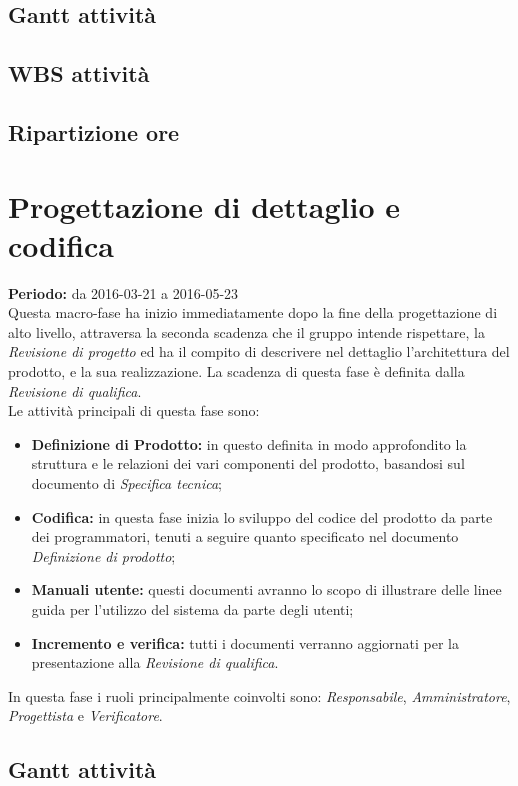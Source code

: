 \documentclass[a4paper]{report}
\begin{document}
			\subsection{Gantt attività}
			\subsection{WBS attività}
			\subsection{Ripartizione ore}
		\section{Progettazione di dettaglio e codifica}
			\textbf{Periodo:} da 2016-03-21 a 2016-05-23 \\
			Questa macro-fase ha inizio immediatamente dopo la fine della progettazione di alto livello, attraversa la seconda 
			scadenza che il gruppo intende rispettare, la \emph{Revisione di progetto} ed ha il compito di descrivere nel dettaglio 
			l'architettura del prodotto, e la sua realizzazione. La scadenza di questa fase è definita dalla 
			\emph{Revisione di qualifica}. \\Le attività principali di questa fase sono:
			\begin{itemize}
				\item \textbf{Definizione di Prodotto:} in questo definita in modo approfondito la struttura e le relazioni 
				dei vari componenti del prodotto, basandosi sul documento di \emph{Specifica tecnica}; 
				\item \textbf{Codifica:} in questa fase inizia lo sviluppo del codice del prodotto da parte dei programmatori, 
				tenuti a seguire quanto specificato nel documento \emph{Definizione di prodotto};
				\item \textbf{Manuali utente:} questi documenti avranno lo scopo di illustrare delle linee guida per l'utilizzo 
				del sistema da parte degli utenti;
				\item \textbf{Incremento e verifica:} tutti i documenti verranno aggiornati per la presentazione alla 
				\emph{Revisione di qualifica}.
			\end{itemize}
			In questa fase i ruoli principalmente coinvolti sono: \emph{Responsabile}, \emph{Amministratore},
			\emph{Progettista} e \emph{Verificatore}.

			\subsection{Gantt attività}
\end{document}
